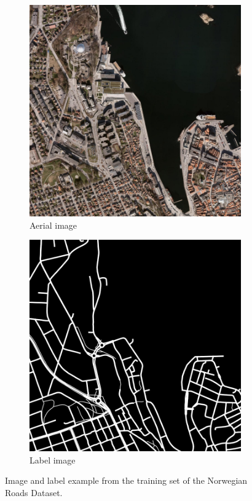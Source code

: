 \begin{figure}
\begin{subfigure}{0.40\textwidth}
\includegraphics[width=\linewidth]{figs/background_theory_example_data.png}
\caption{Aerial image} \label{fig:background_dataset_example_data}
\end{subfigure}
\hspace*{\fill} %
\begin{subfigure}{0.40\textwidth}
\includegraphics[width=\linewidth]{figs/background_theory_example_label.png}
\caption{Label image} \label{fig:background_dataset_example_label}
\end{subfigure}
\caption[Example from the Norwegian Roads Dataset]{Image and label example from the training set of the Norwegian Roads Dataset.} \label{fig:background_dataset_example}
\end{figure}

